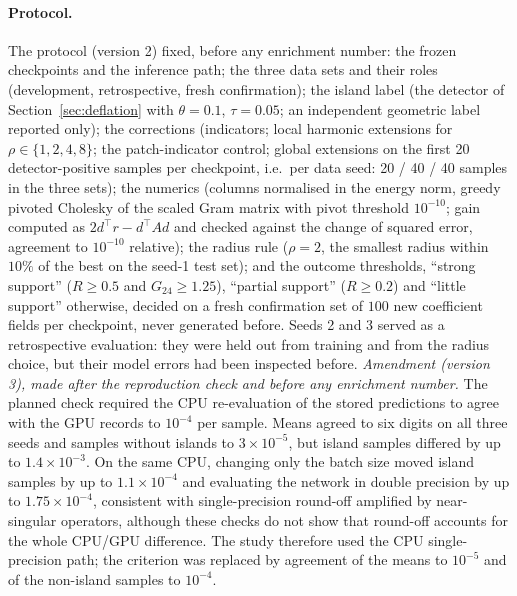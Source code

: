 \paragraph{Protocol.} The protocol (version 2) fixed, before any enrichment number: the frozen checkpoints and the inference
path; the three data sets and their roles (development, retrospective, fresh confirmation); the island label (the detector of
Section~\ref{sec:deflation} with $\theta=0.1$, $\tau=0.05$; an independent geometric label reported only); the corrections
(indicators; local harmonic extensions for $\rho\in\{1,2,4,8\}$; the patch-indicator control; global extensions on the first 20
detector-positive samples per checkpoint, i.e.\ per data seed: 20 / 40 / 40 samples in the three sets); the numerics (columns
normalised in the energy norm, greedy pivoted Cholesky of the scaled Gram matrix with pivot threshold $10^{-10}$; gain computed
as $2d^\top r - d^\top Ad$ and checked against the change of squared error, agreement to $10^{-10}$ relative); the radius rule
($\rho = 2$, the smallest radius within $10\%$ of the best on the seed-1 test set); and the outcome thresholds, ``strong support''
($R\ge0.5$ and $G_{24}\ge1.25$), ``partial support'' ($R\ge0.2$) and ``little support'' otherwise, decided on a fresh
confirmation set of $100$ new coefficient fields per checkpoint, never generated before. Seeds 2 and 3 served as a retrospective
evaluation: they were held out from training and from the radius choice, but their model errors had been inspected before.
\emph{Amendment (version 3), made after the reproduction check and before any enrichment number.} The planned check required the
CPU re-evaluation of the stored predictions to agree with the GPU records to $10^{-4}$ per sample. Means agreed to six digits on
all three seeds and samples without islands to $3\times10^{-5}$, but island samples differed by up to $1.4\times10^{-3}$. On the
same CPU, changing only the batch size moved island samples by up to $1.1\times10^{-4}$ and evaluating the network in double
precision by up to $1.75\times10^{-4}$, consistent with single-precision round-off amplified by near-singular operators, although
these checks do not show that round-off accounts for the whole CPU/GPU difference. The study therefore used the CPU
single-precision path; the criterion was replaced by agreement of the means to $10^{-5}$ and of the non-island samples to $10^{-4}$.

